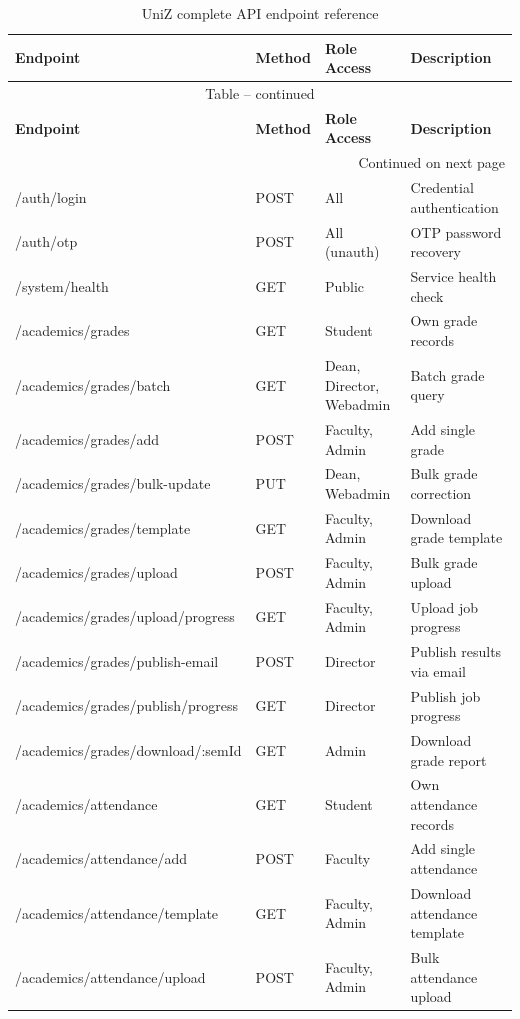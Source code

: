 \documentclass[12pt,a4paper]{report}
\begin{document}
\begin{longtable}{p{4.3cm}p{1.6cm}p{3.2cm}p{3.5cm}}
\caption{UniZ complete API endpoint reference}\label{tab:apiref}\\
\toprule
\textbf{Endpoint} & \textbf{Method} & \textbf{Role Access} & \textbf{Description} \\
\midrule
\endfirsthead
\multicolumn{4}{c}{Table \thetable{} -- continued}\\
\toprule
\textbf{Endpoint} & \textbf{Method} & \textbf{Role Access} & \textbf{Description} \\
\midrule
\endhead
\midrule\multicolumn{4}{r}{Continued on next page}\\
\endfoot
\bottomrule
\endlastfoot
/auth/login & POST & All & Credential authentication \\
/auth/otp & POST & All (unauth) & OTP password recovery \\
/system/health & GET & Public & Service health check \\
/academics/grades & GET & Student & Own grade records \\
/academics/grades/batch & GET & Dean, Director, Webadmin & Batch grade query \\
/academics/grades/add & POST & Faculty, Admin & Add single grade \\
/academics/grades/bulk-update & PUT & Dean, Webadmin & Bulk grade correction \\
/academics/grades/template & GET & Faculty, Admin & Download grade template \\
/academics/grades/upload & POST & Faculty, Admin & Bulk grade upload \\
/academics/grades/upload/progress & GET & Faculty, Admin & Upload job progress \\
/academics/grades/publish-email & POST & Director & Publish results via email \\
/academics/grades/publish/progress & GET & Director & Publish job progress \\
/academics/grades/download/:semId & GET & Admin & Download grade report \\
/academics/attendance & GET & Student & Own attendance records \\
/academics/attendance/add & POST & Faculty & Add single attendance \\
/academics/attendance/template & GET & Faculty, Admin & Download attendance template \\
/academics/attendance/upload & POST & Faculty, Admin & Bulk attendance upload \\

\end{longtable}
\end{document}

